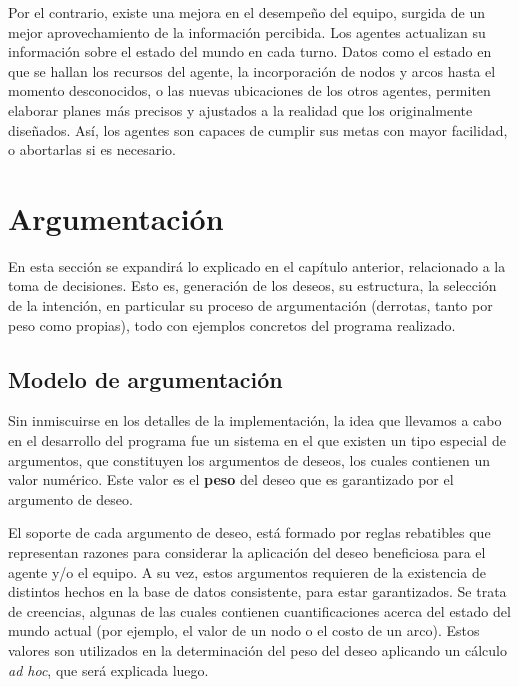 \documentclass[oneside]{book}
\theoremstyle{definition}
\theoremstyle{example}
\begin{document}
Por el contrario, existe una mejora en el desempeño del equipo, surgida de un mejor 
aprovechamiento de la información percibida. Los agentes actualizan su información sobre 
el estado del mundo en cada turno. Datos como el estado en que se hallan los recursos del 
agente, la incorporación de nodos y arcos hasta el momento desconocidos, o las nuevas 
ubicaciones de los otros agentes, permiten elaborar planes más precisos y ajustados a la 
realidad que los originalmente diseñados. Así, los agentes son capaces de cumplir sus 
metas con mayor facilidad, o abortarlas si es necesario.



\chapter{Argumentación}

En esta sección se expandirá lo explicado en el capítulo anterior, relacionado a 
la toma de decisiones. Esto es, generación de los deseos, su estructura, la selección de la
intención, en particular su proceso de argumentación (derrotas, tanto por peso como 
propias), todo con ejemplos concretos del programa realizado. 

\section{Modelo de argumentación} 

\label{sec:modeloDeArgumentacion}

Sin inmiscuirse en los detalles de la implementación, la idea que llevamos a cabo en el 
desarrollo del programa fue un sistema en el que existen un tipo especial de argumentos,
que constituyen los argumentos de deseos, los cuales contienen un valor numérico.
Este valor es el \textbf{peso} del deseo que es garantizado por el argumento de deseo. 

El soporte de cada argumento de deseo, está formado por reglas rebatibles que representan
razones para considerar la aplicación del deseo beneficiosa para el agente y/o el equipo.
A su vez, estos argumentos requieren de la existencia de distintos hechos en la base de 
datos consistente, para estar garantizados. Se trata de creencias, algunas de las cuales
contienen cuantificaciones acerca del estado del mundo actual (por 
ejemplo, el valor de un nodo o el costo de un arco). Estos valores son utilizados en la
determinación del peso del deseo aplicando un cálculo \textit{ad hoc}, %
que será explicada luego.
\end{document}
